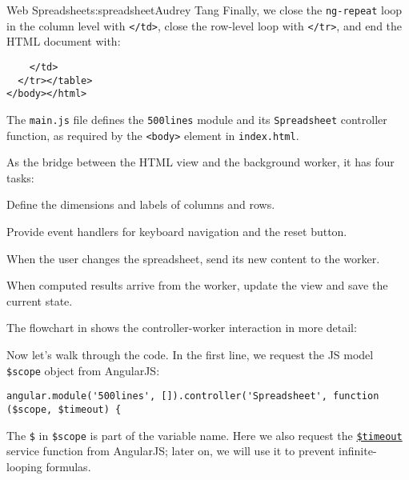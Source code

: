 \begin{aosachapter}{Web Spreadsheet}{s:spreadsheet}{Audrey Tang}
Finally, we close the \texttt{ng-repeat} loop in the column level with
\texttt{\textless{}/td\textgreater{}}, close the row-level loop with
\texttt{\textless{}/tr\textgreater{}}, and end the HTML document with:

\begin{verbatim}
    </td>
  </tr></table>
</body></html>
\end{verbatim}

\label{js-main-controller}

The \texttt{main.js} file defines the \texttt{500lines} module and its
\texttt{Spreadsheet} controller function, as required by the
\texttt{\textless{}body\textgreater{}} element in \texttt{index.html}.

As the bridge between the HTML view and the background worker, it has
four tasks:

\begin{aosaitemize}

\item
  Define the dimensions and labels of columns and rows.
\item
  Provide event handlers for keyboard navigation and the reset button.
\item
  When the user changes the spreadsheet, send its new content to the
  worker.
\item
  When computed results arrive from the worker, update the view and save
  the current state.
\end{aosaitemize}

The flowchart in  shows the
controller-worker interaction in more detail:


Now let's walk through the code. In the first line, we request the JS
model \texttt{\$scope} object from AngularJS:

\begin{verbatim}
angular.module('500lines', []).controller('Spreadsheet', function ($scope, $timeout) {
\end{verbatim}

The \texttt{\$} in \texttt{\$scope} is part of the variable name. Here
we also request the
\href{https://docs.angularjs.org/api/ng/service/\$timeout}{\texttt{\$timeout}}
service function from AngularJS; later on, we will use it to prevent
infinite-looping formulas.


\end{aosachapter}
